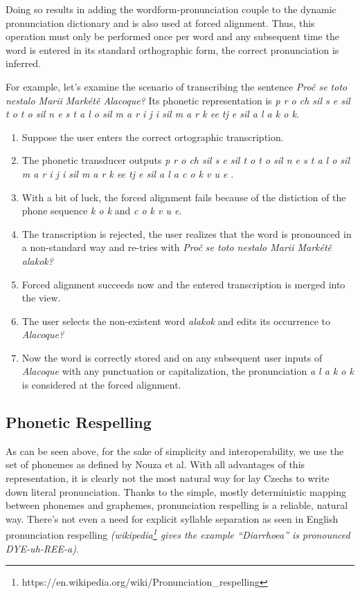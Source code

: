 \documentclass{itatnew}
\begin{document}
Doing so results in adding the wordform-pronunciation couple to the dynamic
pronunciation dictionary and is also used at forced alignment. Thus, this
operation must only be performed once per word and any subsequent time the word
is entered in its standard orthographic form, the correct pronunciation is
inferred.

For example, let's examine the scenario of transcribing the sentence {\em Proč
se toto nestalo Marii Markétě Alacoque?} Its phonetic representation is {\em p r
o ch sil s e sil t o t o sil n e s t a l o sil m a r i j i sil m a r k ee tj e
sil a l a k o k}.
\begin{enumerate}
\item{Suppose the user enters the correct ortographic transcription.}
\item{
    The phonetic transducer outputs {\em
        p r o ch sil
        s e sil
        t o t o sil
        n e s t a l o sil
        m a r i j i sil
        m a r k ee tj e sil
        a l a c o k v u e
    }.
}
\item{
    With a bit of luck, the forced alignment fails because of the distiction of
    the phone sequence {\em k o k} and {\em c o k v u e}.
}
\item{
    The transcription is rejected, the user realizes that the word is pronounced
    in a non-standard way and re-tries with
    {\em Proč se toto nestalo Marii Markétě alakok?}
}
\item{
    Forced alignment succeeds now and the entered transcription is merged into
    the view.
}
\item{
    The user selects the non-existent word {\em alakok} and edits its occurrence
    to {\em Alacoque?}
}
\item{
    Now the word is correctly stored and on any subsequent user inputs of {\em
    Alacoque} with any punctuation or capitalization, the pronunciation
    {\em a l a k o k} is considered at the forced alignment.
}
\end{enumerate}

\subsection{Phonetic Respelling}
\label{subsec:respelling}

As can be seen above, for the sake of simplicity and interoperability, we use
the set of phonemes as defined by Nouza et al.\cite{nouza1997phonetic} With all
advantages of this representation, it is clearly not the most natural way for
lay Czechs to write down literal pronunciation. Thanks to the simple, mostly
deterministic mapping between phonemes and graphemes, pronunciation respelling
is a reliable, natural way. There's not even a need for explicit syllable
separation as seen in English pronunciation respelling {\em
(wikipedia\footnote{https://en.wikipedia.org/wiki/Pronunciation\_respelling}
gives the example {\em ``Diarrhoea'' is pronounced DYE-uh-REE-a})}.
\end{document}
